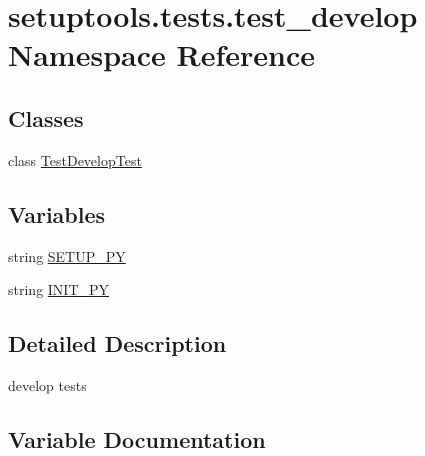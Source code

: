 \hypertarget{namespacesetuptools_1_1tests_1_1test__develop}{}\section{setuptools.\+tests.\+test\+\_\+develop Namespace Reference}
\label{namespacesetuptools_1_1tests_1_1test__develop}
\subsection*{Classes}
\begin{DoxyCompactItemize}
\item 
class \hyperlink{classsetuptools_1_1tests_1_1test__develop_1_1TestDevelopTest}{Test\+Develop\+Test}
\end{DoxyCompactItemize}
\subsection*{Variables}
\begin{DoxyCompactItemize}
\item 
string \hyperlink{namespacesetuptools_1_1tests_1_1test__develop_ad276e6de9b4dcd1bc0ff9daabbb0a2f5}{S\+E\+T\+U\+P\+\_\+\+P\+Y}
\item 
string \hyperlink{namespacesetuptools_1_1tests_1_1test__develop_a4153560893d05ec7d023f67a85b90ece}{I\+N\+I\+T\+\_\+\+P\+Y}
\end{DoxyCompactItemize}


\subsection{Detailed Description}
\begin{DoxyVerb}develop tests
\end{DoxyVerb}
 

\subsection{Variable Documentation}
\hypertarget{namespacesetuptools_1_1tests_1_1test__develop_a4153560893d05ec7d023f67a85b90ece}{}
